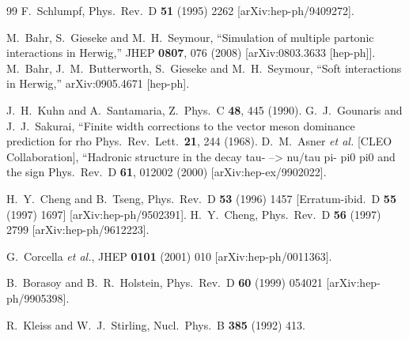 \documentclass{article}
\begin{document}
\begin{thebibliography}{99}
F.~Schlumpf,
Phys.\ Rev.\  D {\bf 51} (1995) 2262 [arXiv:hep-ph/9409272].

  M.~Bahr, S.~Gieseke and M.~H.~Seymour,
  ``Simulation of multiple partonic interactions in Herwig,''
  JHEP {\bf 0807}, 076 (2008)
  [arXiv:0803.3633 [hep-ph]].
  M.~Bahr, J.~M.~Butterworth, S.~Gieseke and M.~H.~Seymour,
  ``Soft interactions in Herwig,''
  arXiv:0905.4671 [hep-ph].

  J.~H.~Kuhn and A.~Santamaria,
  Z.\ Phys.\  C {\bf 48}, 445 (1990).
  G.~J.~Gounaris and J.~J.~Sakurai,
   ``Finite width corrections to the vector meson dominance prediction for rho
  Phys.\ Rev.\ Lett.\  {\bf 21}, 244 (1968).
  D.~M.~Asner {\it et al.}  [CLEO Collaboration],
   ``Hadronic structure in the decay tau- --> nu/tau pi- pi0 pi0 and the  sign
  Phys.\ Rev.\  D {\bf 61}, 012002 (2000)
  [arXiv:hep-ex/9902022].

  H.~Y.~Cheng and B.~Tseng,
  Phys.\ Rev.\  D {\bf 53} (1996) 1457
  [Erratum-ibid.\  D {\bf 55} (1997) 1697]
  [arXiv:hep-ph/9502391].
  H.~Y.~Cheng,
  Phys.\ Rev.\  D {\bf 56} (1997) 2799
  [arXiv:hep-ph/9612223].

  G.~Corcella {\it et al.},
  JHEP {\bf 0101} (2001) 010
  [arXiv:hep-ph/0011363].

B.~Borasoy and B.~R.~Holstein,
Phys.\ Rev.\  D {\bf 60} (1999) 054021 [arXiv:hep-ph/9905398].

 R.~Kleiss and W.~J.~Stirling,
Nucl.\ Phys.\  B {\bf 385} (1992) 413.


\end{thebibliography}
\end{document}

